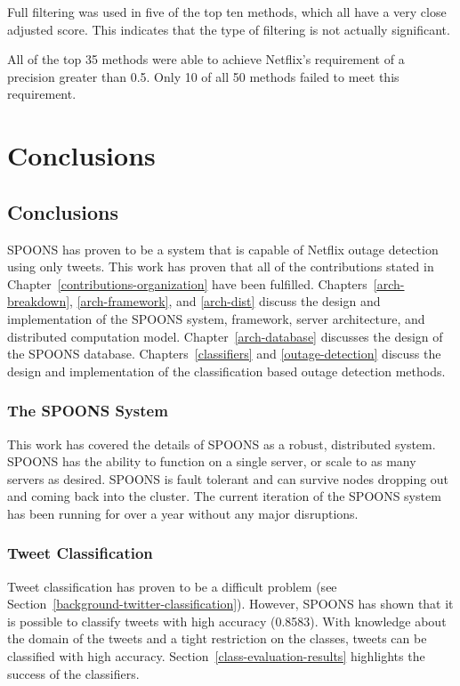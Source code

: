 \documentclass[12pt]{ucthesis}
\begin{document}
Full filtering was used in five of the top ten methods, which all have a very close adjusted score.
This indicates that the type of filtering is not actually significant.

All of the top 35 methods were able to achieve Netflix's requirement of a precision greater than 0.5.
Only 10 of all 50 methods failed to meet this requirement.



\part{Conclusions}
\label{conclusions}

\chapter{Conclusions}
\label{conclusions-conclusions}
SPOONS has proven to be a system that is capable of Netflix outage detection using only tweets.
This work has proven that all of the contributions stated in Chapter~\ref{contributions-organization} have been fulfilled.
Chapters~\ref{arch-breakdown}, \ref{arch-framework}, and \ref{arch-dist} discuss the design and implementation of the SPOONS system, framework, server architecture, and distributed computation model.
Chapter~\ref{arch-database} discusses the design of the SPOONS database.
Chapters~\ref{classifiers} and \ref{outage-detection} discuss the design and implementation of the classification based outage detection methods.

\section{The SPOONS System}
\label{conclusions-conclusions-system}
This work has covered the details of SPOONS as a robust, distributed system.
SPOONS has the ability to function on a single server, or scale to as many servers as desired.
SPOONS is fault tolerant and can survive nodes dropping out and coming back into the cluster.
The current iteration of the SPOONS system has been running for over a year without any major disruptions.

\section{Tweet Classification}
\label{conclusions-conclusions-classification}
Tweet classification has proven to be a difficult problem (see Section~\ref{background-twitter-classification}).
However, SPOONS has shown that it is possible to classify tweets with high accuracy (0.8583).
With knowledge about the domain of the tweets and a tight restriction on the classes, tweets can be classified with high accuracy.
Section~\ref{class-evaluation-results} highlights the success of the classifiers.
\end{document}
